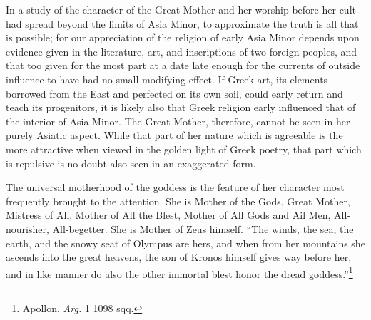 \documentclass[a4paper, 11pt, oneside, polutonikogreek, english]{article}
\begin{document}
In a study of the character of the Great Mother and her worship before her cult had spread beyond the limits of Asia Minor, to approximate the truth is all that is possible; for our appreciation of the religion of early Asia Minor depends upon evidence given in the literature, art, and inscriptions of two foreign peoples, and that too given for the most part at a date late enough for the currents of outside influence to have had no small modifying effect. If Greek art, its elements borrowed from the East and perfected on its own soil, could early return and teach its progenitors, it is likely also that Greek religion early influenced that of the interior of Asia Minor. The Great Mother, therefore, cannot be seen in her purely Asiatic aspect. While that part of her nature which is agreeable is the more attractive when viewed in the golden light of Greek poetry, that part which is repulsive is no doubt also seen in an exaggerated form.

The universal motherhood of the goddess is the feature of her character most frequently brought to the attention. She is Mother of the Gods, Great Mother, Mistress of All, Mother of All the Blest, Mother of All Gods and Ail Men, All-nourisher, All-begetter. She is Mother of Zeus himself. ``The winds, the sea, the earth, and the snowy seat of Olympus are hers, and when from her mountains she ascends into the great heavens, the son of Kronos himself gives way before her, and in like manner do also the other immortal blest honor the dread goddess.''\footnote{Apollon. \emph{Arg.} 1 1098 sqq.}
\end{document}
